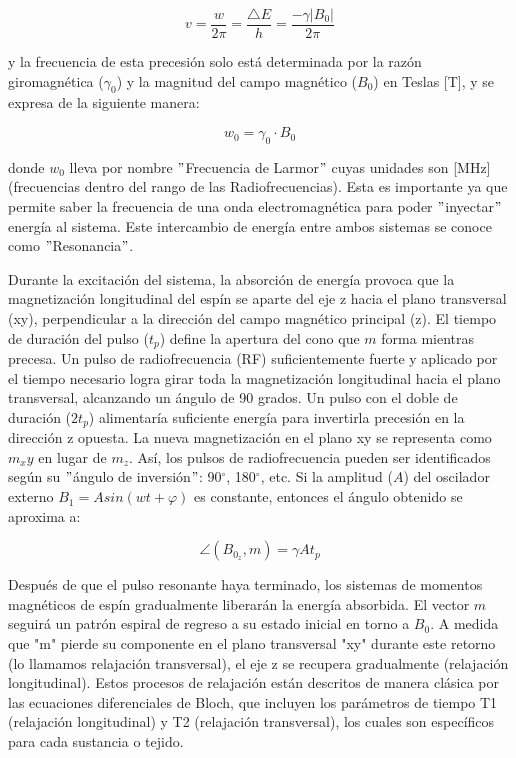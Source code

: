 \documentclass[11pt,letterpaper]{article}
\numberwithin{equation}{subsection}
\numberwithin{table}{subsection}
\begin{document}
\begin{equation}
v = \frac{w}{2\pi} = \frac{\triangle E}{h} = \frac{-\gamma \vert B_0 \vert}{2 \pi}
\label{Larmor}
\end{equation}

\noindent y la frecuencia de esta precesión solo está determinada por la razón giromagnética ($\gamma_0$) y la magnitud del campo magnético ($B_0$) en Teslas [T], y se expresa de la siguiente manera:

\begin{equation}
w_0 = \gamma_0 \cdot B_0
\end{equation}

\noindent donde $w_0$ lleva por nombre $"$Frecuencia de Larmor$"$ cuyas unidades son [MHz] (frecuencias dentro del rango de las Radiofrecuencias). Esta es importante ya que permite saber la frecuencia de una onda electromagnética para poder $"$inyectar$"$ energía al sistema. Este intercambio de energía entre ambos sistemas se conoce como $"$Resonancia$"$. 



\noindent 
\bigskip Durante la excitación del sistema, la absorción de energía provoca que la magnetización longitudinal del espín se aparte del eje z hacia el plano transversal (xy), perpendicular a la dirección del campo magnético principal (z). El tiempo de duración del pulso ($t_p$) define la apertura del cono que $m$ forma mientras precesa. Un pulso de radiofrecuencia (RF) suficientemente fuerte y aplicado por el tiempo necesario logra girar toda la magnetización longitudinal hacia el plano transversal, alcanzando un ángulo de 90 grados. Un pulso con el doble de duración ($2t_p$) alimentaría suficiente energía para invertirla precesión en la dirección z opuesta. La nueva magnetización en el plano xy se representa como $m_xy$ en lugar de $m_z$. Así, los pulsos de radiofrecuencia pueden ser identificados según su $"$ángulo de inversión$"$: 90$^{\circ}$, 180$^{\circ}$, etc. Si la amplitud ($A$) del oscilador externo $B_1=Asin(wt+\varphi)$ es constante, entonces el ángulo obtenido se aproxima a:

\begin{equation}
\angle (B_{0_z},m)=\gamma A t_p
\end{equation}

\bigskip
\noindent Después de que el pulso resonante haya terminado, los sistemas de momentos magnéticos de espín gradualmente liberarán la energía absorbida. El vector $m$ seguirá un patrón espiral de regreso a su estado inicial en torno a $B_0$. A medida que "m" pierde su componente en el plano transversal "xy" durante este retorno (lo llamamos relajación transversal), el eje z se recupera gradualmente (relajación longitudinal). Estos procesos de relajación están descritos de manera clásica por las ecuaciones diferenciales de Bloch, que incluyen los parámetros de tiempo T1 (relajación longitudinal) y T2 (relajación transversal), los cuales son específicos para cada sustancia o tejido. 
\end{document}
